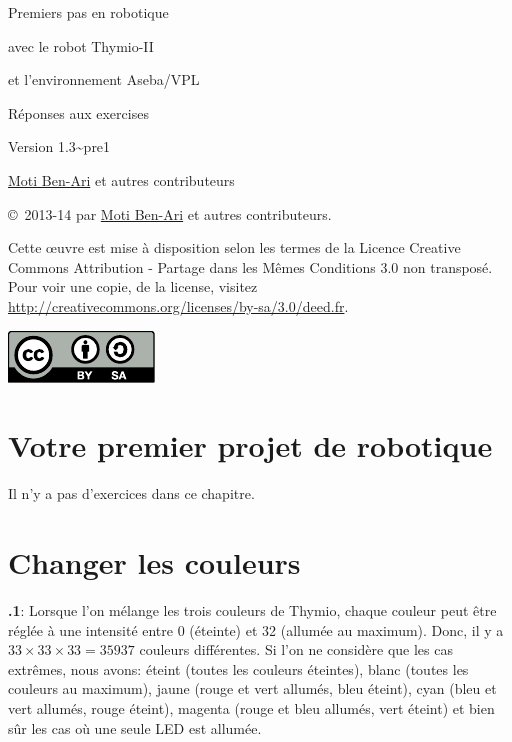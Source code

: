 \documentclass[12pt,a4paper,french]{article}
\begin{document}
\thispagestyle{empty}

\begin{center}
\begin{bfseries}

\begin{Large}
Premiers pas en robotique

avec le robot
Thymio-II

et l'environnement
Aseba/VPL

\bigskip

Réponses aux exercises

\end{Large}

Version 1.3{\textasciitilde}pre1

\bigskip

\href{http://www.weizmann.ac.il/sci-tea/benari/}{Moti Ben-Ari} et autres contributeurs

\end{bfseries}
\end{center}

\bigskip

\copyright{}\  2013-14 par \href{http://www.weizmann.ac.il/sci-tea/benari/}{Moti Ben-Ari} et autres contributeurs.

Cette œuvre est mise à disposition selon les termes de la Licence Creative Commons Attribution - Partage dans les Mêmes Conditions 3.0 non transposé.
Pour voir une copie, de la license, visitez \url{http://creativecommons.org/licenses/by-sa/3.0/deed.fr}.

\begin{center}
\hspace{6pt}\includegraphics[width=.2\textwidth]{../images/by-sa}
\end{center}


\section{Votre premier projet de robotique}

Il n'y a pas d'exercices dans ce chapitre.

\section{Changer les couleurs}

\textbf{\thesection.1}: 
Lorsque l'on mélange les trois couleurs de Thymio, chaque couleur peut être réglée à une intensité entre 0 (éteinte) et 32 (allumée au maximum). Donc, il y a $33 \times 33 \times 33=35 937$ couleurs différentes. Si l'on ne considère que les cas extrêmes, nous avons: éteint (toutes les couleurs éteintes), blanc (toutes les couleurs au maximum), jaune (rouge et vert allumés, bleu éteint), cyan (bleu et vert allumés, rouge éteint), magenta (rouge et bleu allumés, vert éteint) et bien sûr les cas où une seule LED est allumée.
\end{document}
